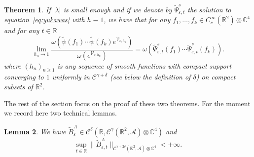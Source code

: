 \documentclass{article}
\newtheorem{theorem}{Theorem}
\newtheorem{lemma}[theorem]{Lemma}
\begin{document}
\begin{theorem}
  \label{theorem_main2}If $| \lambda |$ is small enough and if we denote by
  $\tilde{\Psi}_{\varepsilon, t}^s$ the solution to
  equation~{\eqref{eq:yukawas}} with $h \equiv 1$, we have that for any $f_1,
  \ldots, f_k \in C^{\infty}_c (\mathbb{R}^2) \otimes \mathbb{C}^4$ and for
  any $t \in \mathbb{R}$
  \begin{equation}
    \lim_{h_n \rightarrow 1} \frac{\omega \left( \tilde{\psi} (f_1) \cdots
    \tilde{\psi} (f_k) e^{\mathcal{V}_{\varepsilon, h_n}} \right)}{\omega
    \left( e^{\mathcal{V}_{\varepsilon, h_n}} \right)} = \omega
    (\tilde{\Psi}_{\varepsilon, t}^s (f_1) \cdots \tilde{\Psi}_{\varepsilon,
    t}^s (f_k)) .
  \end{equation}
  where $(h_n)_{n \geqslant 1}$ is any sequence of smooth functions with
  compact support converging to $1$ uniformly in $\mathcal{C}^{\gamma +
  \delta}$ (see below the definition of $\delta$) on compact subsets of
  $\mathbb{R}^2$.
\end{theorem}

The rest of the section focus on the proof of these two theorems. For the
moment we record here two technical lemmas.

\begin{lemma}
  \label{lemma_noise}We have $\tilde{B}^A_{\varepsilon} \in
  \mathcal{C}^{\delta} (\mathbb{R}, \mathcal{C}^{\gamma} (\mathbb{R}^2,
  \mathcal{A}) \otimes \mathbb{C}^4)$ and
  \[ \sup_{t \in \mathbb{R}} \| \tilde{B}^A_{\varepsilon, t}
     \|_{\mathcal{C}^{\gamma + 2 \delta} (\mathbb{R}^2, \mathcal{A}) \otimes
     \mathbb{C}^4} < + \infty ._{} \]
\end{lemma}
\end{document}
